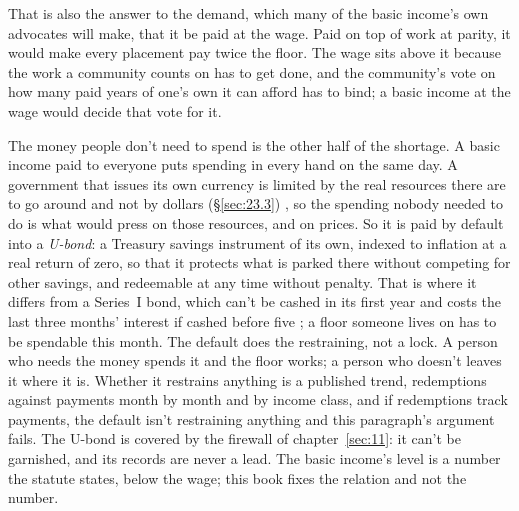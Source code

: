 That is also the answer to the demand, which many of the basic income's own advocates will make, that it be paid at the wage. Paid on top of work at parity, it would make every placement pay twice the floor. The wage sits above it because the work a community counts on has to get done, and the community's vote on how many paid years of one's own it can afford has to bind; a basic income at the wage would decide that vote for it.

The money people don't need to spend is the other half of the shortage. A basic income paid to everyone puts spending in every hand on the same day. A government that issues its own currency is limited by the real resources there are to go around and not by dollars (\S\ref{sec:23.3}) \autocite{fullwiler2012response,kaboub2019globalsouth}, so the spending nobody needed to do is what would press on those resources, and on prices. So it is paid by default into a \emph{U-bond}: a Treasury savings instrument of its own, indexed to inflation at a real return of zero, so that it protects what is parked there without competing for other savings, and redeemable at any time without penalty. That is where it differs from a Series~I bond, which can't be cashed in its first year and costs the last three months' interest if cashed before five \autocite{treasurydirect2026ibonds}; a floor someone lives on has to be spendable this month. The default does the restraining, not a lock. A person who needs the money spends it and the floor works; a person who doesn't leaves it where it is. Whether it restrains anything is a published trend, redemptions against payments month by month and by income class, and if redemptions track payments, the default isn't restraining anything and this paragraph's argument fails. The U-bond is covered by the firewall of chapter~\ref{sec:11}: it can't be garnished, and its records are never a lead. The basic income's level is a number the statute states, below the wage; this book fixes the relation and not the number.
